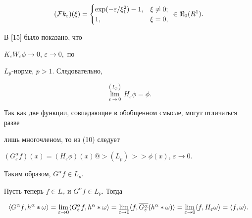 \begin{pf}
\begin{gather*}
%


(\F k_{\varepsilon})(\xi)=


\begin{cases}


\exp(-\varepsilon/{\xi}_1^2)-1, & \xi\neq 0; \\


1, & \xi =0,


\end{cases}


\ \in\Re_0(R^1).


\end{gather*}


В [15] было показано, что


$K_{\varepsilon}W_{\varepsilon}\phi\to 0$, $\varepsilon\to 0,$ по


$L_p$-норме, $p>1$. Следовательно,


\begin{equation}


\lim\limits_{\varepsilon\to 0}^{(L_p)}H_{\varepsilon}\phi=\phi.


\end{equation}


Так как две функции, совпадающие в обобщенном смысле, могут отличаться разве


лишь многочленом, то из (10) следует


$(G_\varepsilon^\alpha f)(x)=(H_\varepsilon\phi)(x)


@>{(L_p)\,}>> \phi(x)$, $\varepsilon\to 0$.


Таким образом, $G^\alpha f\in L_p$.





Пусть теперь $f\in L_r$ и $G^\alpha f\in L_p$. Тогда


\begin{equation}


\la G^\alpha f,h^\alpha *\omega\ra=


\lim\limits_{\varepsilon\to 0}\la G_\varepsilon^


\alpha f,h^\alpha *\omega\ra =


\lim\limits_{\varepsilon\to 0}\la f,


\overline{G_\varepsilon^\alpha}(h^\alpha


*\omega)\ra=\lim\limits_{\varepsilon\to 0}


\la f,H_\varepsilon\omega\ra=\la f,\omega\ra.


\end{equation}



\end{pf}
